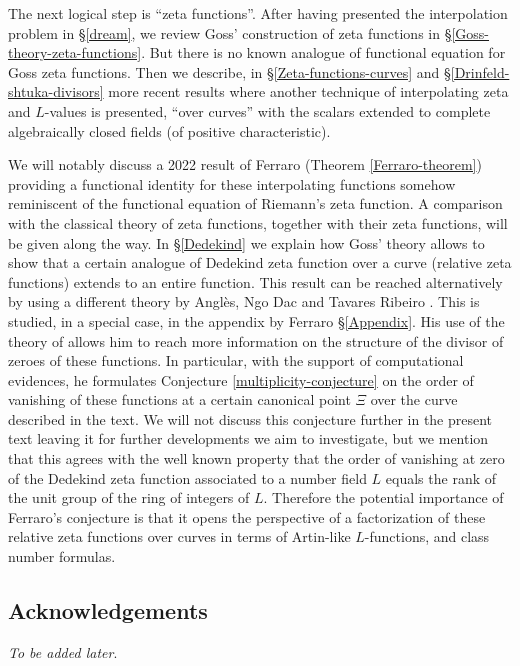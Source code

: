 \documentclass[11pt]{amsart}
\numberwithin{equation}{section}
\begin{document}
The next logical step is ``zeta functions''. After having presented the interpolation problem in \S \ref{dream}, we review Goss' construction of zeta functions in \S \ref{Goss-theory-zeta-functions}. But there is no known analogue of functional equation for Goss zeta functions. Then we describe, in \S \ref{Zeta-functions-curves} and \S \ref{Drinfeld-shtuka-divisors} more recent results where another technique of interpolating zeta and $L$-values is presented, ``over curves'' with the scalars extended to 
complete algebraically closed fields (of positive characteristic). 

We will notably discuss a 2022 result of Ferraro (Theorem \ref{Ferraro-theorem}) providing a functional identity for these interpolating functions somehow reminiscent of the functional equation of Riemann's zeta function. A comparison with the classical theory of zeta functions, together with their zeta functions, will be given along the way. In \S \ref{Dedekind} we explain how Goss' theory allows to show that a certain analogue of Dedekind zeta function over a curve (relative zeta functions) extends to an entire function.
This result can be reached alternatively by using a different theory by Angl\`es, Ngo Dac and Tavares Ribeiro \cite{ANG&NGO&TAV}. This is studied, in a special case, in the appendix by Ferraro \S \ref{Appendix}. His use of the theory of \cite{ANG&NGO&TAV} allows him to reach more information on the structure of the divisor of zeroes of these functions. In particular, with the support of computational evidences, he formulates Conjecture \ref{multiplicity-conjecture} on the order of vanishing of these functions
at a certain canonical point $\Xi$ over the curve described in the text. We will not discuss this conjecture further in the present text leaving it for further developments we aim to investigate, but we mention that this agrees with the well known property that the order of vanishing at zero of the Dedekind zeta function associated to a number field $L$ equals the rank of the unit group
of the ring of integers of $L$. Therefore the potential importance of Ferraro's conjecture is that it opens the perspective of a 
factorization of these relative zeta functions over curves in terms of Artin-like $L$-functions, and class number formulas.

\subsection*{Acknowledgements} {\em To be added later}.
\end{document}
